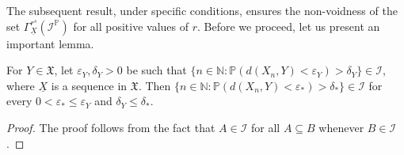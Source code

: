 \documentclass[reqno]{amsart}
\begin{document}
The subsequent result, under specific conditions, ensures the non-voidness of the set $\Gamma^{r^s}_{\underline{X}}(\mathcal{I}^{\mathbb{P}})$ for all positive values of $r$. Before we proceed, let us present an important lemma.
\begin{lemma}\label{lemma 2.10}
	For $Y\in \mathfrak{X}$, let $\varepsilon_Y,\delta_Y>0$ be such that
$\{n\in\mathbb{N}:\mathbb{P}(d(X_n,Y)<\varepsilon_Y)>\delta_{Y}\}\in\mathcal{I}$, where $\underline{X}$ is a sequence in $\mathfrak{X}$. Then $\{n\in\mathbb{N}:\mathbb{P}(d(X_n,Y)<\varepsilon_*)>\delta_{*}\}\in\mathcal{I}$ for every $0<\varepsilon_*\leq\varepsilon_Y$ and $\delta_Y\leq\delta_*$.
\end{lemma}
\begin{proof}
The proof follows from the fact that $A\in\mathcal{I}$ for all $A\subseteq B$ whenever $B\in\mathcal{I}$.
\end{proof}
\end{document}
